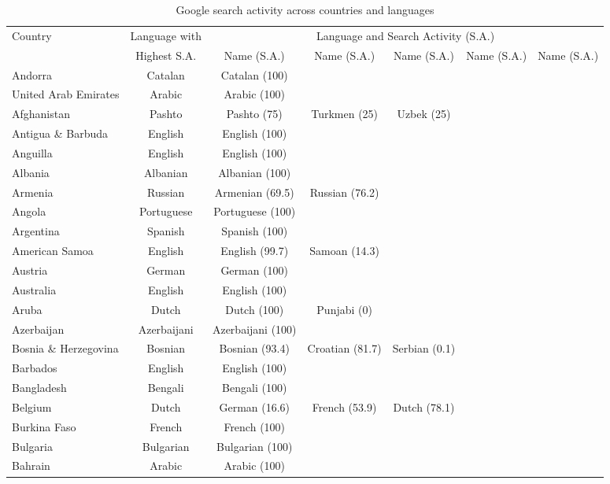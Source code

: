 \begin{longtable}{lc | c | c | c | c | c} 
 \caption{Google search activity across countries and languages} 
\label{tab:sa_language_table} \\ 
\hline 
  Country & Language with     & \multicolumn{5}{c}{Language and Search Activity (S.A.)} \\ 
  \cline{3-7} 
      & Highest S.A. & Name (S.A.) & Name (S.A.) & Name (S.A.) & Name (S.A.) & Name (S.A.) \\ 
 \hline 
 Andorra & Catalan & Catalan (100) &   &   &   &   \\ 
 United Arab Emirates & Arabic & Arabic (100) &   &   &   &   \\ 
 Afghanistan & Pashto & Pashto (75) & Turkmen (25) & Uzbek (25) &   &   \\ 
 Antigua \& Barbuda & English & English (100) &   &   &   &   \\ 
 Anguilla & English & English (100) &   &   &   &   \\ 
 Albania & Albanian & Albanian (100) &   &   &   &   \\ 
 Armenia & Russian & Armenian (69.5) & Russian (76.2) &   &   &   \\ 
 Angola & Portuguese & Portuguese (100) &   &   &   &   \\ 
 Argentina & Spanish & Spanish (100) &   &   &   &   \\ 
 American Samoa & English & English (99.7) & Samoan (14.3) &   &   &   \\ 
 Austria & German & German (100) &   &   &   &   \\ 
 Australia & English & English (100) &   &   &   &   \\ 
 Aruba & Dutch & Dutch (100) & Punjabi (0) &   &   &   \\ 
 Azerbaijan & Azerbaijani & Azerbaijani (100) &   &   &   &   \\ 
 Bosnia \& Herzegovina & Bosnian & Bosnian (93.4) & Croatian (81.7) & Serbian (0.1) &   &   \\ 
 Barbados & English & English (100) &   &   &   &   \\ 
 Bangladesh & Bengali & Bengali (100) &   &   &   &   \\ 
 Belgium & Dutch & German (16.6) & French (53.9) & Dutch (78.1) &   &   \\ 
 Burkina Faso & French & French (100) &   &   &   &   \\ 
 Bulgaria & Bulgarian & Bulgarian (100) &   &   &   &   \\ 
 Bahrain & Arabic & Arabic (100) &   &   &   &   \\ 

\end{longtable}
